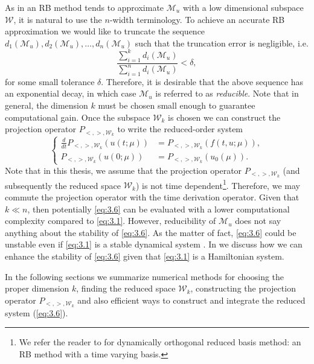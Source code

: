As in an RB method tends to approximate $\mathcal M_u$ with a low dimensional subspace $\mathcal W$, it is natural to use the $n$-width terminology. To achieve an accurate RB approximation we would like to truncate the sequence $d_1(\mathcal M_u),d_2(\mathcal M_u),\dots, d_n(\mathcal M_u)$ such that the truncation error is negligible, i.e.
\begin{equation} \label{eq:3.5}
	\frac{\sum_{i=1}^k d_i(\mathcal M_u) }{\sum_{i=1}^n d_i(\mathcal M_u) } < \delta,
\end{equation}
for some small tolerance $\delta$. Therefore, it is desirable that the above sequence has an exponential decay, in which case $\mathcal M_u$ is referred to as \emph{reducible}. Note that in general, the dimension $k$ must be chosen small enough to guarantee computational gain. Once the subspace $\mathcal W_k$ is chosen we can construct the projection operator $P_{<,>,\mathcal W_k}$ to write the reduced-order system
\begin{equation} \label{eq:3.6}
\left\{
\begin{aligned}
	\frac d{dt} P_{<,>,\mathcal W_k}(u(t;\mu)) &= P_{<,>,\mathcal W_k}(f(t,u;\mu)),\\
	P_{<,>,\mathcal W_k}(u(0;\mu)) &= P_{<,>,\mathcal W_k}( u_0(\mu) ).
\end{aligned}
\right.
\end{equation}
Note that in this thesis, we assume that the projection operator $P_{<,>,\mathcal W_k}$ (and subsequently the reduced space $\mathcal W_k$) is not time dependent\footnote{We refer the reader to \cite{doi:10.1137/140967787,doi:10.1137/16M1095202} for dynamically orthogonal reduced basis method: an RB method with a time varying basis.}. Therefore, we may commute the projection operator with the time derivation operator. Given that $k \ll n$, then potentially \cref{eq:3.6} can be evaluated with a lower computational complexity compared to \cref{eq:3.1}. However, reducibility of $\mathcal M_u$ does not say anything about the stability of \cref{eq:3.6}. As the matter of fact, \cref{eq:3.6} could be unstable even if \cref{eq:3.1} is a stable dynamical system \cite{doi:10.1137/140978922,doi:10.1137/17M1111991}. In  we discuss how we can enhance the stability of \cref{eq:3.6} given that \cref{eq:3.1} is a Hamiltonian system.

In the following sections we summarize numerical methods for choosing the proper dimension $k$, finding the reduced space $\mathcal W_k$, constructing the projection operator $P_{<,>,\mathcal W_k}$ and also efficient ways to construct and integrate the reduced system (\ref{eq:3.6}).

